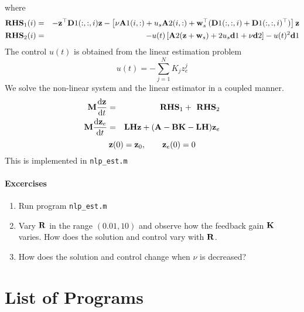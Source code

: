 \documentclass[12pt]{article}
\begin{document}
where 
\begin{eqnarray*}
 \textbf{RHS}_1(i) &=& - {\mathbf z}^\top {\mathbf D}1(:,:,i) {\mathbf z} - \left[ \nu {\mathbf A}1(i,:) + u_s {\mathbf A}2(i,:) + {\mathbf w}_s^\top ({\mathbf D}1(:,:,i) + {\mathbf D}1(:,:,i)^\top) \right] {\mathbf z} \\
 \textbf{RHS}_2(i) &=& - u(t) \left[ {\mathbf A}2 ({\mathbf z} + {\mathbf w}_s) + 2 u_s {\mathbf d}1 +\nu {\mathbf d}2 \right] - u(t)^2 {\mathbf d}1 
\end{eqnarray*}
The control $u(t)$ is obtained from the linear estimation problem
\[
 u(t) = - \sum_{j=1}^N K_j z_e^j
\]
We solve the non-linear system and the linear estimator in a coupled manner.
\begin{eqnarray*}
 {\mathbf M} \frac{\textrm{d} {\mathbf z}}{\textrm{d} t} &=& \textbf{ RHS}_1 + \textbf{ RHS}_2\\
 {\mathbf M} \frac{\textrm{d} {\mathbf z}_e}{\textrm{d} t} &=& {\mathbf L} {\mathbf H} {\mathbf z} + ({\mathbf A} - {\mathbf B} {\mathbf K} - {\mathbf L} {\mathbf H}) {\mathbf z}_e
\end{eqnarray*}
\[
{\mathbf z}(0) = {\mathbf z}_0, \qquad {\mathbf z}_e(0) = 0
\]
This is implemented in {\tt nlp\_est.m}

\paragraph{Excercises}

\begin{enumerate}

\item Run program {\tt nlp\_est.m}

\item Vary ${\mathbf R}$ in the range $(0.01,10)$ and observe how the feedback gain ${\mathbf K}$ varies. How does the solution and control vary with ${\mathbf R}$.

\item How does the solution and control change when $\nu$ is decreased?

\end{enumerate}

\section{List of Programs}
\end{document}
